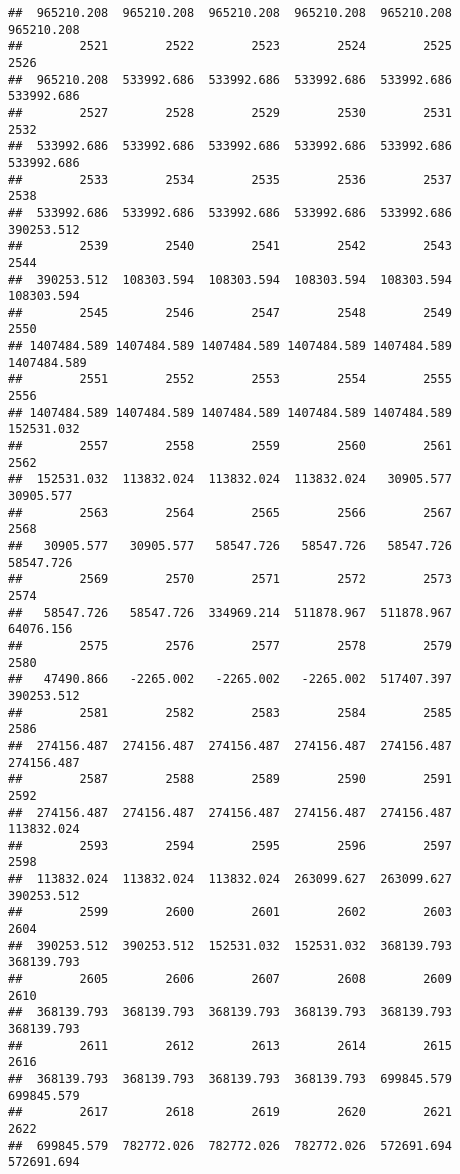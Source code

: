 \documentclass[
]{book}
\begin{document}
\begin{verbatim}
##  965210.208  965210.208  965210.208  965210.208  965210.208  965210.208 
##        2521        2522        2523        2524        2525        2526 
##  965210.208  533992.686  533992.686  533992.686  533992.686  533992.686 
##        2527        2528        2529        2530        2531        2532 
##  533992.686  533992.686  533992.686  533992.686  533992.686  533992.686 
##        2533        2534        2535        2536        2537        2538 
##  533992.686  533992.686  533992.686  533992.686  533992.686  390253.512 
##        2539        2540        2541        2542        2543        2544 
##  390253.512  108303.594  108303.594  108303.594  108303.594  108303.594 
##        2545        2546        2547        2548        2549        2550 
## 1407484.589 1407484.589 1407484.589 1407484.589 1407484.589 1407484.589 
##        2551        2552        2553        2554        2555        2556 
## 1407484.589 1407484.589 1407484.589 1407484.589 1407484.589  152531.032 
##        2557        2558        2559        2560        2561        2562 
##  152531.032  113832.024  113832.024  113832.024   30905.577   30905.577 
##        2563        2564        2565        2566        2567        2568 
##   30905.577   30905.577   58547.726   58547.726   58547.726   58547.726 
##        2569        2570        2571        2572        2573        2574 
##   58547.726   58547.726  334969.214  511878.967  511878.967   64076.156 
##        2575        2576        2577        2578        2579        2580 
##   47490.866   -2265.002   -2265.002   -2265.002  517407.397  390253.512 
##        2581        2582        2583        2584        2585        2586 
##  274156.487  274156.487  274156.487  274156.487  274156.487  274156.487 
##        2587        2588        2589        2590        2591        2592 
##  274156.487  274156.487  274156.487  274156.487  274156.487  113832.024 
##        2593        2594        2595        2596        2597        2598 
##  113832.024  113832.024  113832.024  263099.627  263099.627  390253.512 
##        2599        2600        2601        2602        2603        2604 
##  390253.512  390253.512  152531.032  152531.032  368139.793  368139.793 
##        2605        2606        2607        2608        2609        2610 
##  368139.793  368139.793  368139.793  368139.793  368139.793  368139.793 
##        2611        2612        2613        2614        2615        2616 
##  368139.793  368139.793  368139.793  368139.793  699845.579  699845.579 
##        2617        2618        2619        2620        2621        2622 
##  699845.579  782772.026  782772.026  782772.026  572691.694  572691.694 

\end{verbatim}
\end{document}
